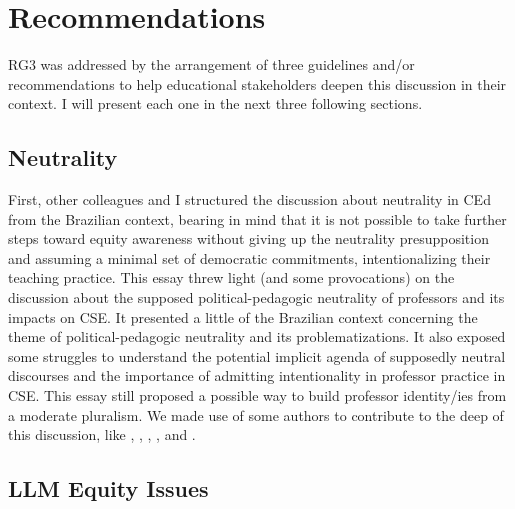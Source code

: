 \section{Recommendations}
\label{disc-sec:recommendations}

\gls{RG}3 was addressed by the arrangement of three guidelines and/or recommendations to help educational stakeholders deepen this discussion in their context. I will present each one in the next three following sections.

\subsection{Neutrality}
\label{disc-ss:neutrality}

First, other colleagues and I
structured the discussion about neutrality in \gls{CEd} \cite{bispojr:2022-educomp} from the Brazilian context, bearing in mind that it is not possible to take further steps toward equity awareness without giving up the neutrality presupposition and assuming a minimal set of democratic commitments, intentionalizing their teaching practice. This essay threw light (and some provocations) on the discussion about the supposed political-pedagogic neutrality of professors and its impacts on \gls{CSE}. It presented a little of the Brazilian context concerning the theme of political-pedagogic neutrality and its problematizations. It also exposed some struggles to understand the potential implicit agenda of supposedly neutral discourses and the importance of admitting intentionality in professor practice in \gls{CSE}. This essay still proposed a possible way to build professor identity/ies from a moderate pluralism. We made use of some authors to contribute to the deep of this discussion, like , , , , and .

\subsection{LLM Equity Issues}
\label{disc-ss:llm-equity-issues}

